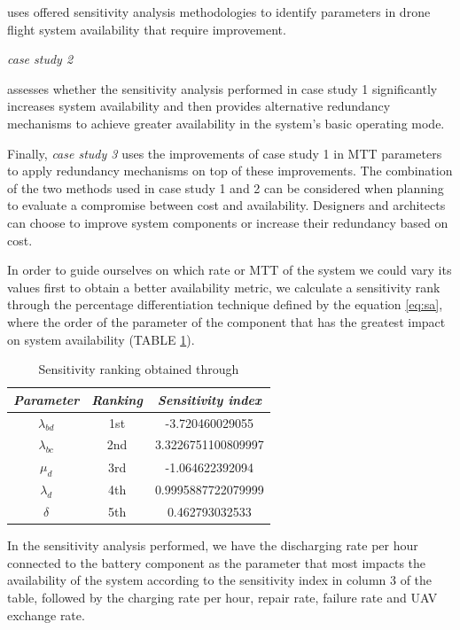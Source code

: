 \documentclass[conference]{IEEEtran}
\begin{document}
uses offered sensitivity analysis methodologies to identify parameters in drone flight system availability that require improvement.

\textit{case study 2} 

assesses whether the sensitivity analysis performed in case study 1 significantly increases system availability and then provides alternative redundancy mechanisms to achieve greater availability in the system's basic operating mode.

Finally, \textit{case study 3} uses the improvements of case study 1 in MTT parameters to apply redundancy mechanisms on top of these improvements. The combination of the two methods used in case study 1 and 2 can be considered when planning to evaluate a compromise between cost and availability. Designers and architects can choose to improve system components or increase their redundancy based on cost.

In order to guide ourselves on which rate or MTT of the system we could vary its values first to obtain a better availability metric, we calculate a sensitivity rank through the percentage differentiation technique defined by the equation \ref{eq:sa}, where the order of the parameter of the component that has the greatest impact on system availability (TABLE \ref{tab:sa_rank}).

\begin{table}[htbp]
\caption{Sensitivity ranking obtained through}
\begin{center}
\begin{tabular}{|c|c|c|}
\hline
\textbf{\textit{Parameter}}& \textbf{\textit{Ranking}} & \textbf{\textit{Sensitivity index}} \\
\hline
\(\lambda_{bd}\) & 1st & -3.720460029055 \\
\(\lambda_{bc}\) & 2nd & 3.3226751100809997 \\
 \(\mu_{d}\) & 3rd & -1.064622392094 \\
\(\lambda_{d}\) & 4th & 0.9995887722079999 \\
\(\delta\) & 5th & 0.462793032533 \\
\hline
\end{tabular}
\label{tab:sa_rank}
\end{center}
\end{table}

In the sensitivity analysis performed, we have the discharging rate per hour connected to the battery component as the parameter that most impacts the availability of the system according to the sensitivity index in column 3 of the table, followed by the charging rate per hour, repair rate, failure rate and UAV exchange rate.
\end{document}
